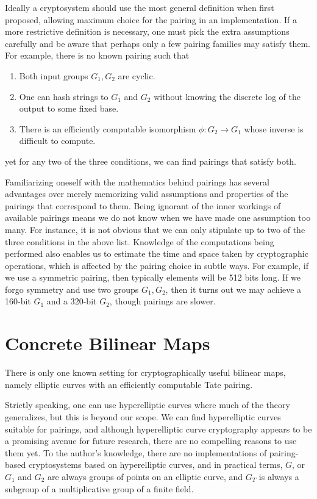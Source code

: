 Ideally a cryptosystem should use the most general definition
when first proposed, allowing maximum choice for the pairing in an
implementation.
If a more restrictive definition is necessary,
one must pick the extra assumptions carefully
and be aware that perhaps only a few pairing families may satisfy them.
For example, there is no known pairing such that
\begin{enumerate}
\item Both input groups $G_1, G_2$ are cyclic.
\item One can hash strings to $G_1$ and $G_2$ without knowing the
discrete log of the output to some fixed base.
\item There is an efficiently computable isomorphism $\phi:G_2\rightarrow G_1$
whose inverse is difficult to compute.
\end{enumerate}
yet for any two of the three conditions, we can find pairings that satisfy
both.

Familiarizing oneself with the mathematics behind pairings
has several advantages over merely memorizing valid assumptions
and properties of the pairings that correspond to them.
Being ignorant of the inner workings of
available pairings means we do not know when we have made one assumption
too many. For instance, it is not obvious that
we can only stipulate up to two of the three conditions in the above list.
Knowledge of the computations being performed also enables us to estimate
the time and space taken by cryptographic operations, which is affected
by the pairing choice in subtle ways.
For example, if we use a symmetric pairing, then typically
elements will be 512 bits long.
If we forgo symmetry and use two groups $G_1, G_2$,
then it turns out we may achieve a 160-bit $G_1$ and a 320-bit $G_2$,
though pairings are slower.

\section{Concrete Bilinear Maps}

There is only one known setting for cryptographically useful bilinear maps,
namely elliptic curves with an efficiently computable
Tate pairing.

Strictly speaking, one can use hyperelliptic
curves where much of the theory generalizes, but this is beyond
our scope.
We can find hyperelliptic
curves~\cite{galbraith,rubinsilverberg,freemanhyper} suitable for
pairings, and although hyperelliptic curve cryptography appears to
be a promising avenue for future research, there are no compelling reasons
to use them yet.
To the author's knowledge, there are no implementations
of pairing-based cryptosystems based on hyperelliptic curves,
and in practical terms, $G$, or $G_1$ and $G_2$ are always
groups of points on
an elliptic curve, and $G_T$ is always a subgroup of a multiplicative group
of a finite field.


